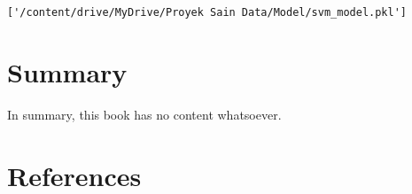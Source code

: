 \documentclass[
  letterpaper,
]{krantz}
\newlength{\cslhangindent}
\newlength{\cslentryspacingunit} %
\newenvironment{CSLReferences}[2] %
 {%
  \setlength{\parindent}{0pt}
  \ifodd #1
  \let\oldpar\par
  \def\par{\hangindent=\cslhangindent\oldpar}
  \fi
  \setlength{\parskip}{#2\cslentryspacingunit}
 }%
 {}
\begin{document}
\begin{verbatim}
['/content/drive/MyDrive/Proyek Sain Data/Model/svm_model.pkl']
\end{verbatim}


\hypertarget{summary}{%
\chapter{Summary}\label{summary}}

In summary, this book has no content whatsoever.


\hypertarget{references}{%
\chapter*{References}\label{references}}


\hypertarget{refs}{}
\begin{CSLReferences}{0}{0}
\end{CSLReferences}



\backmatter
\printindex
\end{document}
